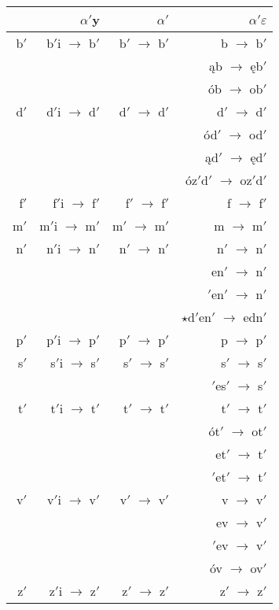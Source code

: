 \documentclass{article}
\begin{document}
\begin{longtable}{r|rrr}
 & \boldmath$\alpha'${\bf y} & \boldmath$\alpha'$ & \boldmath$\alpha'\varepsilon$\\
\hline
b$'$ & b$'$i $\rightarrow$ b$'$ & b$'$ $\rightarrow$ b$'$ & b $\rightarrow$ b$'$\\
 &  &  & ąb $\rightarrow$ ęb$'$\\
 &  &  & ób $\rightarrow$ ob$'$\\
\hline
d$'$ & d$'$i $\rightarrow$ d$'$ & d$'$ $\rightarrow$ d$'$ & d$'$ $\rightarrow$ d$'$\\
 &  &  & ód$'$ $\rightarrow$ od$'$\\
 &  &  & ąd$'$ $\rightarrow$ ęd$'$\\
 &  &  & óz$'$d$'$ $\rightarrow$ oz$'$d$'$\\
\hline
f$'$ & f$'$i $\rightarrow$ f$'$ & f$'$ $\rightarrow$ f$'$ & f $\rightarrow$ f$'$\\
\hline
m$'$ & m$'$i $\rightarrow$ m$'$ & m$'$ $\rightarrow$ m$'$ & m $\rightarrow$ m$'$\\
\hline
n$'$ & n$'$i $\rightarrow$ n$'$ & n$'$ $\rightarrow$ n$'$ & n$'$ $\rightarrow$ n$'$\\
 &  &  & en$'$ $\rightarrow$ n$'$\\
 &  &  & $'$en$'$ $\rightarrow$ n$'$\\
 &  &  & $\star$d$'$en$'$ $\rightarrow$ edn$'$\\
\hline
p$'$ & p$'$i $\rightarrow$ p$'$ & p$'$ $\rightarrow$ p$'$ & p $\rightarrow$ p$'$\\
\hline
s$'$ & s$'$i $\rightarrow$ s$'$ & s$'$ $\rightarrow$ s$'$ & s$'$ $\rightarrow$ s$'$\\
 &  &  & $'$es$'$ $\rightarrow$ s$'$\\
\hline
t$'$ & t$'$i $\rightarrow$ t$'$ & t$'$ $\rightarrow$ t$'$ & t$'$ $\rightarrow$ t$'$\\
 &  &  & ót$'$ $\rightarrow$ ot$'$\\
 &  &  & et$'$ $\rightarrow$ t$'$\\
 &  &  & $'$et$'$ $\rightarrow$ t$'$\\
\hline
v$'$ & v$'$i $\rightarrow$ v$'$ & v$'$ $\rightarrow$ v$'$ & v $\rightarrow$ v$'$\\
 &  &  & ev $\rightarrow$ v$'$\\
 &  &  & $'$ev $\rightarrow$ v$'$\\
 &  &  & óv $\rightarrow$ ov$'$\\
\hline
z$'$ & z$'$i $\rightarrow$ z$'$ & z$'$ $\rightarrow$ z$'$ & z$'$ $\rightarrow$ z$'$\\

\end{longtable}
\end{document}
